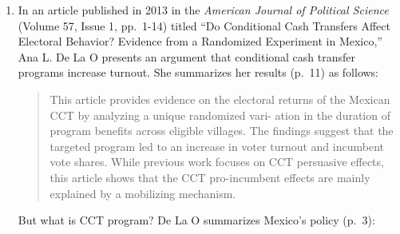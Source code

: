 \documentclass[]{book}
\theoremstyle{definition}
\theoremstyle{definition}
\theoremstyle{definition}
\theoremstyle{remark}
\begin{document}
\begin{enumerate}

  \begin{table}[!h]

  \caption{\label{tab:socialpressuredata}The numbers of experimental subjects in each condition and the number of subjects in each condition that voted in Gerber, Green, and Larimer's (2008) experiment.}
  \centering
  \end{table}

\item
  In an article published in 2013 in the \emph{American Journal of
  Political Science} (Volume 57, Issue 1, pp.~1-14) titled ``Do
  Conditional Cash Transfers Affect Electoral Behavior? Evidence from a
  Randomized Experiment in Mexico,'' Ana L. De La O presents an argument
  that conditional cash transfer programs increase turnout. She
  summarizes her results (p.~11) as follows:

  \begin{quote}
  This article provides evidence on the electoral returns of the Mexican
  CCT by analyzing a unique randomized vari- ation in the duration of
  program benefits across eligible villages. The findings suggest that
  the targeted program led to an increase in voter turnout and incumbent
  vote shares. While previous work focuses on CCT persuasive effects,
  this article shows that the CCT pro-incumbent effects are mainly
  explained by a mobilizing mechanism.
  \end{quote}

  But what is CCT program? De La O summarizes Mexico's policy (p.~3):


\end{enumerate}
\end{document}

